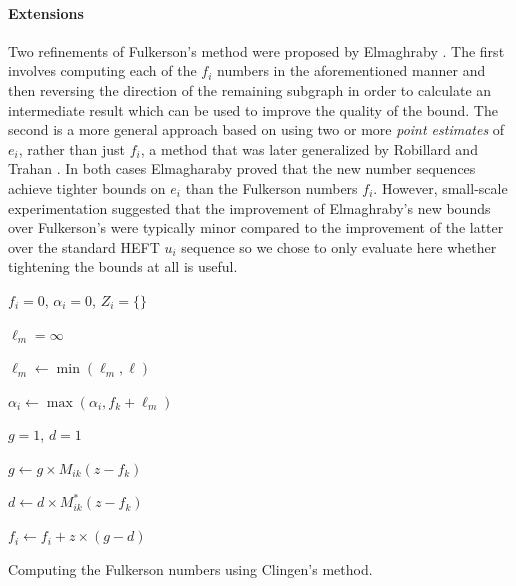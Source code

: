 \documentclass[12pt]{article}
\begin{document}
\paragraph{Extensions}
\label{para.fulkerson_extensions}

Two refinements of Fulkerson's method were proposed by Elmaghraby \cite{elmaghraby67}. The first involves computing each of the $f_i$ numbers in the aforementioned manner and then reversing the direction of the remaining subgraph in order to calculate an intermediate result which can be used to improve the quality of the bound. The second is a more general approach based on using two or more {\em point estimates} of $e_i$, rather than just $f_i$, a method that was later generalized by Robillard and Trahan \cite{robillard76}. In both cases Elmagharaby proved that the new number sequences achieve tighter bounds on $e_i$ than the Fulkerson numbers $f_i$. However, small-scale experimentation suggested that the improvement of Elmaghraby's new bounds over Fulkerson's were typically minor compared to the improvement of the latter over the standard HEFT $u_i$ sequence so we chose to only evaluate here whether tightening the bounds at all is useful.

\begin{algorithm}	
	
	{	
		$f_i = 0$, $\alpha_i = 0$, $Z_i = \{\}$
		
		{
			$\ell_m = \infty$
			
			{
				$\ell_m \leftarrow \min(\ell_m, \ell)$
				
			}
			
			$\alpha_i \leftarrow \max(\alpha_i, f_k + \ell_m)$
		}
		
		
		{
			{
				$g = 1$, $d = 1$
				
				{
					$g \leftarrow g \times M_{ik}(z - f_k)$
					
					$d \leftarrow d \times M_{ik}^{*}(z - f_k)$
				}
				
				$f_i \leftarrow f_i + z \times (g - d)$				
			}
		}		
	}	
	\caption{Computing the Fulkerson numbers using Clingen's method.}
	\label{alg.fulkerson}
\end{algorithm} 
\end{document}
